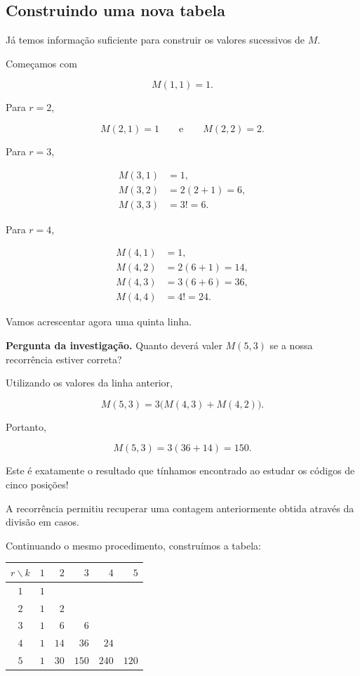 \documentclass[11pt,a4paper,oneside]{book}
\newcommand{\Pergunta}[1]{\begin{perguntabox}\textbf{Pergunta da investigação.} #1\end{perguntabox}}
\renewcommand\arraystretch{1.18}
\begin{document}
\subsection*{Construindo uma nova tabela}

Já temos informação suficiente para
construir os valores sucessivos de $M$.

Começamos com

\[
M(1,1)=1.
\]

Para $r=2$,

\[
M(2,1)=1
\qquad\text{e}\qquad
M(2,2)=2.
\]

Para $r=3$,

\[
\begin{aligned}
M(3,1)&=1,\\
M(3,2)&=2(2+1)=6,\\
M(3,3)&=3!=6.
\end{aligned}
\]

Para $r=4$,

\[
\begin{aligned}
M(4,1)&=1,\\
M(4,2)&=2(6+1)=14,\\
M(4,3)&=3(6+6)=36,\\
M(4,4)&=4!=24.
\end{aligned}
\]

Vamos acrescentar agora uma quinta linha.

\Pergunta{Quanto deverá valer $M(5,3)$
se a nossa recorrência estiver correta?}

Utilizando os valores da linha anterior,

\[
M(5,3)=3\bigl(M(4,3)+M(4,2)\bigr).
\]

Portanto,

\[
M(5,3)=3(36+14)=150.
\]

Este é exatamente o resultado
que tínhamos encontrado ao estudar
os códigos de cinco posições!

A recorrência permitiu recuperar
uma contagem anteriormente obtida
através da divisão em casos.

Continuando o mesmo procedimento,
construímos a tabela:

\begin{center}
\renewcommand{\arraystretch}{1.45}
\begin{tabular}{c|rrrrr}
\hline
$r\backslash k$
& $1$ & $2$ & $3$ & $4$ & $5$\\
\hline
$1$ & $1$ & & & &\\
$2$ & $1$ & $2$ & & &\\
$3$ & $1$ & $6$ & $6$ & &\\
$4$ & $1$ & $14$ & $36$ & $24$ &\\
$5$ & $1$ & $30$ & $150$ & $240$ & $120$\\
\hline
\end{tabular}
\end{center}
\end{document}
